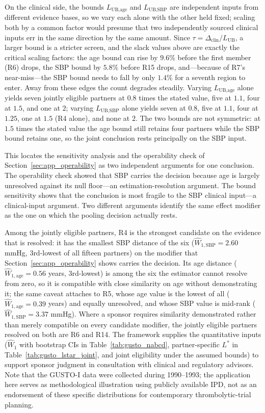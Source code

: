 \documentclass[AMA,Times1COL]{WileyNJDv5}
\begin{document}
On the clinical side, the bounds $L_{\text{UB,age}}$ and $L_{\text{UB,SBP}}$ are independent inputs from different evidence bases, so we vary each alone with the other held fixed; scaling both by a common factor would presume that two independently sourced clinical inputs err in the same direction by the same amount. Since $\tau = \Delta_{\text{clin}}/L_{\text{UB}}$, a larger bound is a stricter screen, and the slack values above are exactly the critical scaling factors: the age bound can rise by $9.6\%$ before the first member (R6) drops, the SBP bound by $5.8\%$ before R15 drops, and---because of R7's near-miss---the SBP bound needs to fall by only $1.4\%$ for a seventh region to enter. Away from these edges the count degrades steadily. Varying $L_{\text{UB,age}}$ alone yields seven jointly eligible partners at $0.8$ times the stated value, five at $1.1$, four at $1.5$, and one at $2$; varying $L_{\text{UB,SBP}}$ alone yields seven at $0.8$, five at $1.1$, four at $1.25$, one at $1.5$ (R4 alone), and none at $2$. The two bounds are not symmetric: at $1.5$ times the stated value the age bound still retains four partners while the SBP bound retains one, so the joint conclusion rests principally on the SBP input.

This locates the sensitivity analysis and the operability check of Section~\ref{sec:app_operability} as two independent arguments for one conclusion. The operability check showed that SBP carries the decision because age is largely unresolved against its null floor---an estimation-resolution argument. The bound sensitivity shows that the conclusion is most fragile to the SBP clinical input---a clinical-input argument. Two different arguments identify the same effect modifier as the one on which the pooling decision actually rests.

Among the jointly eligible partners, R4 is the strongest candidate on the evidence that is resolved: it has the smallest SBP distance of the six ($\widehat{W}_{1,\text{SBP}} = 2.60$ mmHg, 3rd-lowest of all fifteen partners) on the modifier that Section~\ref{sec:app_operability} shows carries the decision. Its age distance ($\widehat{W}_{1,\text{age}} = 0.56$ years, 3rd-lowest) is among the six the estimator cannot resolve from zero, so it is compatible with close similarity on age without demonstrating it; the same caveat attaches to R5, whose age value is the lowest of all ($\widehat{W}_{1,\text{age}} = 0.39$ years) and equally unresolved, and whose SBP value is mid-rank ($\widehat{W}_{1,\text{SBP}} = 3.37$ mmHg). Where a sponsor requires similarity demonstrated rather than merely compatible on every candidate modifier, the jointly eligible partners resolved on both are R6 and R14. The framework supplies the quantitative inputs ($\widehat{W}_1$ with bootstrap CIs in Table~\ref{tab:gusto_nabcd}, partner-specific $L^*$ in Table~\ref{tab:gusto_lstar_joint}, and joint eligibility under the assumed bounds) to support sponsor judgment in consultation with clinical and regulatory advisors. Note that the GUSTO-I data were collected during 1990--1993; the application here serves as methodological illustration using publicly available IPD, not as an endorsement of these specific distributions for contemporary thrombolytic-trial planning.
\end{document}
